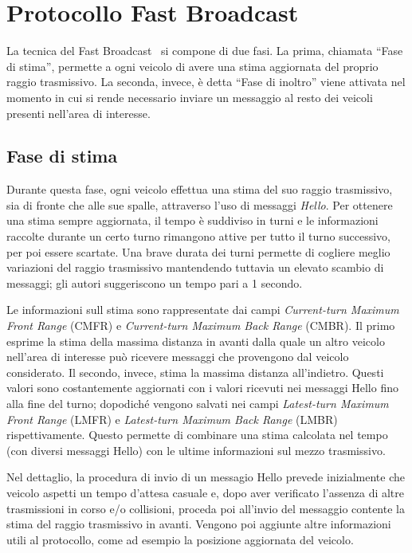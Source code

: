 %
\chapter{Protocollo Fast Broadcast}
La tecnica del Fast Broadcast~\cite{Palazzi07howdo} si compone di due fasi. La prima, chiamata ``Fase di stima'', permette a ogni veicolo di avere una stima aggiornata
del proprio raggio trasmissivo. La seconda, invece, è detta ``Fase di inoltro'' viene attivata nel momento in cui si rende necessario inviare un messaggio
al resto dei veicoli presenti nell'area di interesse.
%
\section{Fase di stima}
Durante questa fase, ogni veicolo effettua una stima del suo raggio trasmissivo, sia di fronte che alle sue spalle, attraverso l'uso di messaggi \textit{Hello}.
Per ottenere una stima sempre aggiornata, il tempo è suddiviso in turni e le informazioni raccolte durante un certo turno
rimangono attive per tutto il turno successivo, per poi essere scartate.
Una brave durata dei turni permette di cogliere meglio variazioni del raggio trasmissivo mantendendo tuttavia un elevato scambio di messaggi;
gli autori suggeriscono un tempo pari a 1 secondo.

Le informazioni sull stima sono rappresentate dai campi \textit{Current-turn Maximum Front Range} (CMFR) e \textit{Current-turn Maximum Back Range} (CMBR).
Il primo esprime la stima della massima distanza in avanti dalla quale un altro veicolo nell'area di interesse può ricevere messaggi che provengono dal veicolo considerato.
Il secondo, invece, stima la massima distanza all'indietro.
Questi valori sono costantemente aggiornati con i valori ricevuti nei messaggi Hello fino alla fine del turno;
dopodiché vengono salvati nei campi \textit{Latest-turn Maximum Front Range} (LMFR) e \textit{Latest-turn Maximum Back Range} (LMBR) rispettivamente.
Questo permette di combinare una stima calcolata nel tempo (con diversi messaggi Hello) con le ultime informazioni sul mezzo trasmissivo.

Nel dettaglio, la procedura di invio di un messagio Hello prevede inizialmente che veicolo aspetti un tempo d'attesa casuale e,
dopo aver verificato l'assenza di altre trasmissioni in corso e/o collisioni, proceda poi all'invio del messaggio contente
la stima del raggio trasmissivo in avanti.
Vengono poi aggiunte altre informazioni utili al protocollo, come ad esempio la posizione aggiornata del veicolo.

